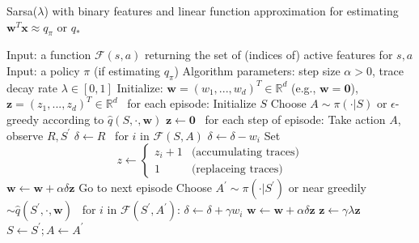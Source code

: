 \documentclass[12pt,a4paper]{article}
\begin{document}
\begin{algorithm}
\caption{Sarsa($\lambda$) with binary features and linear function approximation for estimating $\mathbf{w}^{T}\mathbf{x} \approx q_{\pi}$ or $q_{*}$}
\begin{algorithmic}
	\State Input: a function $\mathcal{F}(s, a)$ returning the set of (indices of) active features for $s,a$
	\State Input: a policy $\pi$ (if estimating $q_{\pi}$)
	\State Algorithm parameters: step size $\alpha > 0$, trace decay rate $\lambda \in [0, 1]$
	\State Initialize: $\mathbf{w}=(w_1, ..., w_d)^{T} \in \mathbb{R}^{d}$ (e.g., $\mathbf{w} = \mathbf{0}$), $\mathbf{z}=(z_1, ..., z_d)^{T} \in \mathbb{R}^{d}$
	\State
	\Loop\ for each episode:
		\State Initialize $S$
		\State Choose $A \sim \pi(\cdot|S)$ or $\epsilon$-greedy according to $\hat{q}(S, \cdot, \mathbf{w})$
		\State $\mathbf{z} \leftarrow \mathbf{0}$
		\Loop\ for each step of episode:
			\State Take action $A$, observe $R, S^{'}$
			\State $\delta \leftarrow R$
			\Loop\ for $i$ in $\mathcal{F}(S, A)$
				\State $\delta \leftarrow \delta - w_{i}$
				\State Set $$z \leftarrow \left\{
				\begin{array}{ll}
				z_{i}+1 & \text{(accumulating traces)}\\
				1 &  \text{(replaceing traces)}				
				\end{array}\right.
				$$
			\EndLoop
				\State $\mathbf{w} \leftarrow \mathbf{w} + \alpha \delta \mathbf{z}$
				\State Go to next episode
			\EndIf
			\State Choose $A^{'} \sim \pi(\cdot|S^{'})$ or near greedily $\sim \hat{q}(S^{'}, \cdot, \mathbf{w})$
			\Loop\ for $i$ in $\mathcal{F}(S^{'}, A^{'})$:
				\State $\delta \leftarrow \delta + \gamma w_{i}$
			\EndLoop
			\State $\mathbf{w} \leftarrow \mathbf{w} + \alpha\delta\mathbf{z}$
			\State $\mathbf{z} \leftarrow \gamma\lambda\mathbf{z}$
			\State $S \leftarrow S^{'}; A \leftarrow A^{'}$
			
		\EndLoop
	\EndLoop
\end{algorithmic}
\end{algorithm}

\newpage
\end{document}
